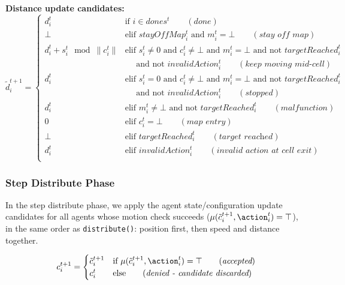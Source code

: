 \textbf{Distance update candidates:}
\begin{equation}
\tilde{d}_i^{t+1} =
        \begin{cases}
            d_i^{t} & \text{if } i \in dones^t \qquad (\textit{done}) \\
            \bot & \text{elif } stayOffMap_i^t \text{ and } m_i^{t} = \bot \qquad (\textit{stay off map}) \\
            d_i^{t} + s_i^t \mod \lVert c_i^t \rVert & \text{elif } s_i^t \not= 0 \text{ and } c_i^t \not= \bot \text{ and } m_i^{t} = \bot \text{ and not } targetReached_i^t \\
                                                      & \quad \text{ and not } invalidAction_i^t \qquad (\textit{keep moving mid-cell}) \\
            d_i^{t} & \text{elif } s_i^t = 0 \text{ and } c_i^t \not= \bot \text{ and } m_i^{t} = \bot \text{ and not } targetReached_i^t \\
                    & \quad \text{ and not } invalidAction_i^t \qquad (\textit{stopped}) \\
            d_i^{t} & \text{elif } m_i^{t} \not= \bot \text{ and not } targetReached_i^t \qquad (\textit{malfunction}) \\
            0 & \text{elif } c_i^t = \bot \qquad (\textit{map entry}) \\
            \bot & \text{elif } targetReached_i^t \qquad (\textit{target reached}) \\
            d_i^{t} & \text{elif } invalidAction_i^t \qquad (\textit{invalid action at cell exit}) \\
        \end{cases}
\end{equation}

\subsubsection{Step Distribute Phase}

In the step distribute phase, we apply the agent state/configuration update candidates for all agents whose
motion check succeeds ($\mu(\tilde{c}_i^{t+1}, \action_i^t) = \top$), in the same order as \texttt{distribute()}:
position first, then speed and distance together.

\begin{equation}
c_i^{t+1} =
        \begin{cases}
            \tilde{c}_i^{t+1} & \text{if } \mu(\tilde{c}_i^{t+1}, \action_i^t) = \top \qquad (\textit{accepted}) \\
            c_i^{t} & \text{else} \qquad (\textit{denied - candidate discarded}) \\
        \end{cases}
\end{equation}

